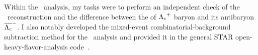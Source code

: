 Within the \Lambdac\ analysis, my tasks were to perform an independent check of the \Lambdac\ reconstruction and the difference between the of ${\Lambda_\text{c}}^+$ baryon and its antibaryon $\overline{{\Lambda_\text{c}}}^-$\@. I also notably developed the mixed-event combinatorial-background subtraction method for the \Lambdac\ analysis and provided it in the general STAR open-heavy-flavor-analysis code~\cite{mixedEventCode}\@.



% 

